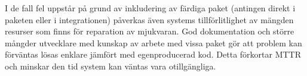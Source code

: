 I de fall fel uppstår på grund av inkludering av färdiga paket (antingen direkt i paketen eller i integrationen) påverkas även systems tillförlitlighet av mängden resurser som finns för reparation av mjukvaran. God dokumentation och större mångder utvecklare med kunskap av arbete med vissa paket gör att problem kan förväntas lösas enklare jämfört med egenproducerad kod. Detta förkortar MTTR och minskar den tid system kan väntas vara otillgängliga.
